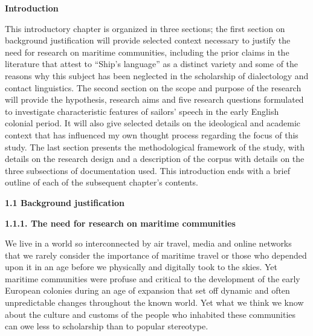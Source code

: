 \setcounter{listWWNumxiiileveli}{0}
\begin{listWWNumxiiileveli}
\item 
\clearpage\begin{styleNormali}
\textbf{Introduction}
\end{styleNormali}

\end{listWWNumxiiileveli}
\begin{styleNormali}
This introductory chapter is organized in three sections; the first section on background justification will provide selected context necessary to justify the need for research on maritime communities, including the prior claims in the literature that attest to “Ship’s language” as a distinct variety and some of the reasons why this subject has been neglected in the scholarship of dialectology and contact linguistics. The second section on the scope and purpose of the research will provide the\textbf{ }hypothesis, research aims and five research questions formulated to investigate characteristic features of sailors’ speech in the early English colonial period. It will also give selected details on the ideological and academic context that has influenced my own thought process regarding the focus of this study. The last section presents the methodological framework of the study, with details on the research design and a description of the corpus with details on the three subsections of documentation used. This introduction ends with a brief outline of each of the subsequent chapter’s contents.
\end{styleNormali}


\begin{styleNormali}
\textbf{1.1 Background justification }
\end{styleNormali}


\begin{styleNormali}
\textbf{1.1.1. The need for research on maritime communities}
\end{styleNormali}


\begin{styleNormali}
We live in a world so interconnected by air travel, media and online networks that we rarely consider the importance of maritime travel or those who depended upon it in an age before we physically and digitally took to the skies. Yet maritime communities were profuse and critical to the development of the early European colonies during an age of expansion that set off dynamic and often unpredictable changes throughout the known world. Yet what we think we know about the culture and customs of the people who inhabited these communities can owe less to scholarship than to popular stereotype. 
\end{styleNormali}


